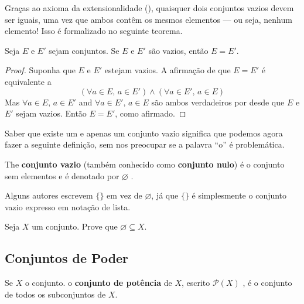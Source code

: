 Graças ao axioma da extensionalidade (), quaisquer dois conjuntos vazios devem ser iguais, uma vez que ambos contêm os mesmos elementos --- ou seja, nenhum elemento! Isso é formalizado no seguinte teorema.

\begin{theorem}
\label{thmEmptySetIsUnique}
Seja $E$ e $E'$ sejam conjuntos. Se $E$ e $E'$ são vazios, então $E=E'$.
\end{theorem}
\begin{proof}
Suponha que $E$ e $E'$ estejam vazios. A afirmação de que $E=E'$ é equivalente a
\[ (\forall a \in E,\, a \in E') \wedge (\forall a \in E',\, a \in E) \]
Mas $\forall a \in E,\, a \in E'$ and $\forall a \in E',\, a \in E$ são ambos verdadeiros por  desde que $E$ e $E'$ sejam vazios. Então $E=E'$, como afirmado.
\end{proof}

Saber que existe um e apenas um conjunto vazio significa que podemos agora fazer a seguinte definição, sem nos preocupar se a palavra “o” é problemática.

\begin{definition}
\label{defEmptySet}
The \textbf{conjunto vazio} (também conhecido como \textbf{conjunto nulo}) é o conjunto sem elementos e é denotado por $\varnothing$ .
\end{definition}

Alguns autores escrevem $\{ \}$ em vez de $\varnothing$, já que $\{ \}$ é simplesmente o conjunto vazio expresso em notação de lista.

\begin{exercise}
\label{exEmptySetSubsetOfEverySet}
Seja $X$ um conjunto. Prove que $\varnothing \subseteq X$.
\end{exercise}

\subsection*{Conjuntos de Poder}

\begin{definition}
\label{defPowerSet}
Se $X$ o conjunto. o \textbf{conjunto de potência} de $X$, escrito $\mathcal{P}(X)$ , é o conjunto de todos os subconjuntos de $X$.
\end{definition}

